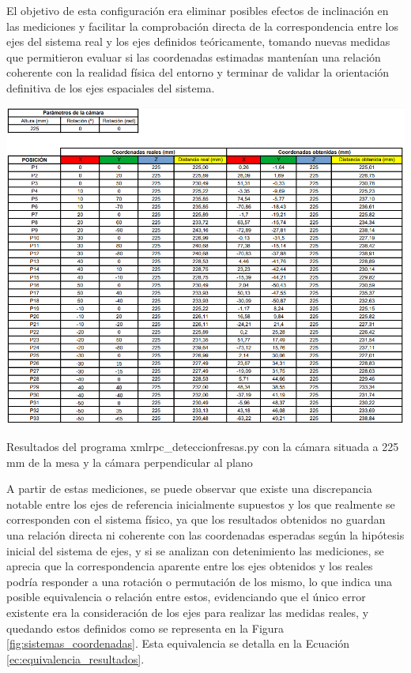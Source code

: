 El objetivo de esta configuración era eliminar posibles efectos de inclinación en las mediciones y facilitar la comprobación directa de la correspondencia entre los ejes del sistema real y los ejes definidos teóricamente, tomando nuevas medidas que permitieron evaluar si las coordenadas estimadas mantenían una relación coherente con la realidad física del entorno y terminar de validar la orientación definitiva de los ejes espaciales del sistema.

  \begin{table}[H]
     \centering
     \begin{center}
       \includegraphics[width=155mm]{figs/Resultados 225 mm 0 grados.png}
     \end{center}
     \caption{Resultados del programa xmlrpc\_deteccionfresas.py con la cámara situada a 225 mm de la mesa y la cámara perpendicular al plano}
     \label{tab:resultados_180mm_58grados}
  \end{table}

A partir de estas mediciones, se puede observar que existe una discrepancia notable entre los ejes de referencia inicialmente supuestos y los que realmente se corresponden con el sistema físico, ya que los resultados obtenidos no guardan una relación directa ni coherente con las coordenadas esperadas según la hipótesis inicial del sistema de ejes, y si se analizan con detenimiento las mediciones, se aprecia que la correspondencia aparente entre los ejes obtenidos y los reales podría responder a una rotación o permutación de los mismo, lo que indica una posible equivalencia o relación entre estos, evidenciando que el único error existente era la consideración de los ejes para realizar las medidas reales, y quedando estos definidos como se representa en la Figura \ref{fig:sistemas_coordenadas}. Esta equivalencia se detalla en la Ecuación \ref{ec:equivalencia_resultados}.


